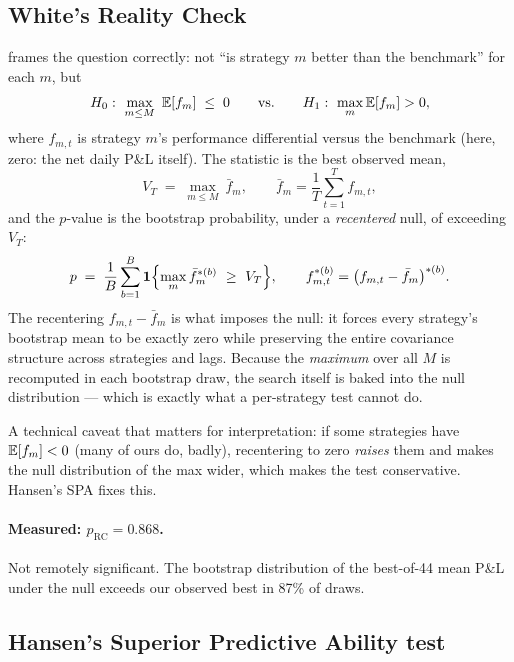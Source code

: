 \subsection{White's Reality Check}
\label{sec:mt:whiterc}

\cite{white2000realitycheck} frames the question correctly: not ``is strategy $m$ better
than the benchmark'' for each $m$, but
\begin{equation}
  H_0:\ \max_{m\le M}\ \mathbb{E}[f_{m}] \;\le\; 0
  \qquad\text{vs.}\qquad
  H_1:\ \max_m \mathbb{E}[f_m] > 0,
  \label{eq:rc:null}
\end{equation}
where $f_{m,t}$ is strategy $m$'s performance differential versus the benchmark (here,
zero: the net daily P\&L itself). The statistic is the best observed mean,
\begin{equation}
  V_T \;=\; \max_{m\le M}\ \bar f_m,
  \qquad \bar f_m = \frac1T\sum_{t=1}^T f_{m,t},
  \label{eq:rc:stat}
\end{equation}
and the $p$-value is the bootstrap probability, under a \emph{recentered} null, of
exceeding $V_T$:
\begin{equation}
  p \;=\; \frac{1}{B}\sum_{b=1}^{B}\mathbf 1\Bigl\{\max_m \bar f_m^{*(b)} \ \ge\ V_T\Bigr\},
  \qquad
  f_{m,t}^{*(b)} = \bigl(f_{m,t} - \bar f_m\bigr)^{*(b)} .
  \label{eq:rc:pvalue}
\end{equation}
The recentering $f_{m,t}-\bar f_m$ is what imposes the null: it forces every strategy's
bootstrap mean to be exactly zero while preserving the entire covariance structure across
strategies and lags. Because the \emph{maximum} over all $M$ is recomputed in each
bootstrap draw, the search itself is baked into the null distribution --- which is exactly
what a per-strategy test cannot do.

A technical caveat that matters for interpretation: if some strategies have
$\mathbb{E}[f_m]<0$ (many of ours do, badly), recentering to zero \emph{raises} them and makes the
null distribution of the max wider, which makes the test conservative. Hansen's SPA fixes
this.

\paragraph{Measured: $p_{\text{RC}} = 0.868$.} Not remotely significant. The bootstrap
distribution of the best-of-44 mean P\&L under the null exceeds our observed best in 87\%
of draws.

\subsection{Hansen's Superior Predictive Ability test}
\label{sec:mt:hansen}

